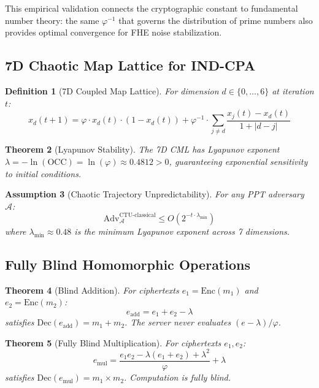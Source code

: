 \documentclass[11pt,a4paper]{article}
\newtheorem{theorem}{Theorem}[section]
\newtheorem{definition}[theorem]{Definition}
\newtheorem{assumption}[theorem]{Assumption}
\begin{document}
This empirical validation connects the cryptographic constant to fundamental number theory: the same $\varphi^{-1}$ that governs the distribution of prime numbers also provides optimal convergence for FHE noise stabilization.

\subsection{7D Chaotic Map Lattice for IND-CPA}

\begin{definition}[7D Coupled Map Lattice]
For dimension $d \in \{0,\ldots,6\}$ at iteration $t$:
\begin{equation}
    x_d(t+1) = \varphi \cdot x_d(t) \cdot (1 - x_d(t)) + \varphi^{-1} \cdot \sum_{j \neq d} \frac{x_j(t) - x_d(t)}{1 + |d - j|}
\end{equation}
\end{definition}

\begin{theorem}[Lyapunov Stability]
The 7D CML has Lyapunov exponent $\lambda = -\ln(\text{OCC}) = \ln(\varphi) \approx 0.4812 > 0$, guaranteeing exponential sensitivity to initial conditions.
\end{theorem}

\begin{assumption}[Chaotic Trajectory Unpredictability]
For any PPT adversary $\mathcal{A}$:
\begin{equation}
    \text{Adv}^{\text{CTU-classical}}_{\mathcal{A}} \leq O(2^{-t \cdot \lambda_{\min}})
\end{equation}
where $\lambda_{\min} \approx 0.48$ is the minimum Lyapunov exponent across 7 dimensions.
\end{assumption}

\subsection{Fully Blind Homomorphic Operations}

\begin{theorem}[Blind Addition]
For ciphertexts $e_1 = \text{Enc}(m_1)$ and $e_2 = \text{Enc}(m_2)$:
\begin{equation}
    e_{\text{add}} = e_1 + e_2 - \lambda
\end{equation}
satisfies $\text{Dec}(e_{\text{add}}) = m_1 + m_2$. The server never evaluates $(e - \lambda)/\varphi$.
\end{theorem}

\begin{theorem}[Fully Blind Multiplication]
For ciphertexts $e_1, e_2$:
\begin{equation}
    e_{\text{mul}} = \frac{e_1 e_2 - \lambda(e_1 + e_2) + \lambda^2}{\varphi} + \lambda
\end{equation}
satisfies $\text{Dec}(e_{\text{mul}}) = m_1 \times m_2$. Computation is fully blind.
\end{theorem}
\end{document}
